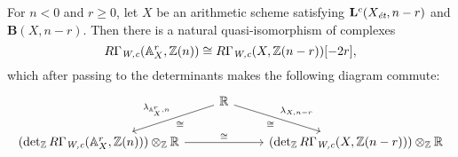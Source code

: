 \documentclass{article}
\numberwithin{equation}{section}
\begin{document}
\begin{lemma}
  \label{lemma:lambda-and-affine-bundles}
  For $n < 0$ and $r \ge 0$, let $X$ be an arithmetic scheme satisfying
  $\mathbf{L}^c (X_\et,n-r)$ and $\mathbf{B} (X,n-r)$. Then there is a natural
  quasi-isomorphism of complexes
  \begin{equation}
    \label{eqn:RGamma-Wc-and-affine-bundles}
    R\Gamma_\Wc (\AA^r_X, \ZZ (n)) \cong R\Gamma_\Wc (X, \ZZ (n-r)) [-2r],
  \end{equation}
  which after passing to the determinants makes the following diagram commute:
  \begin{equation}
    \label{eqn:lambda-and-affine-bundles}
    \begin{tikzcd}
    & \RR\ar{dl}{\cong}[swap]{\lambda_{\AA^r_X,n}}\ar{dr}{\lambda_{X,n-r}}[swap]{\cong} \\
      (\det_\ZZ R\Gamma_\Wc (\AA^r_X, \ZZ (n)))\otimes_\ZZ \RR \ar{rr}{\cong} & & (\det_\ZZ R\Gamma_\Wc (X, \ZZ (n-r)))\otimes_\ZZ \RR
    \end{tikzcd}
  \end{equation}


\end{lemma}
\end{document}
